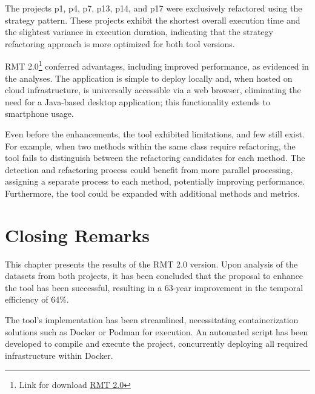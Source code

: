 The projects p1, p4, p7, p13, p14, and p17 were exclusively refactored using the strategy pattern. These projects exhibit the shortest overall execution time and the slightest variance in execution duration, indicating that the strategy refactoring approach is more optimized for both tool versions. 

RMT 2.0\footnote{Link for download \href{https://github.com/magnuspedro/spring-rmt}{RMT 2.0}} conferred advantages, including improved performance, as evidenced in the analyses. The application is simple to deploy locally and, when hosted on cloud infrastructure, is universally accessible via a web browser, eliminating the need for a Java-based desktop application; this functionality extends to smartphone usage.

Even before the enhancements, the tool exhibited limitations, and few still exist. For example, when two methods within the same class require refactoring, the tool fails to distinguish between the refactoring candidates for each method. The detection and refactoring process could benefit from more parallel processing, assigning a separate process to each method, potentially improving performance. Furthermore, the tool could be expanded with additional methods and metrics.

\section{Closing Remarks}
\label{sec-closing-results}

This chapter presents the results of the RMT 2.0 version. Upon analysis of the datasets from both projects, it has been concluded that the proposal to enhance the tool has been successful, resulting in a 63-year improvement in the temporal efficiency of 64\%. 

The tool's implementation has been streamlined, necessitating containerization solutions such as Docker or Podman for execution. An automated script has been developed to compile and execute the project, concurrently deploying all required infrastructure within Docker.
